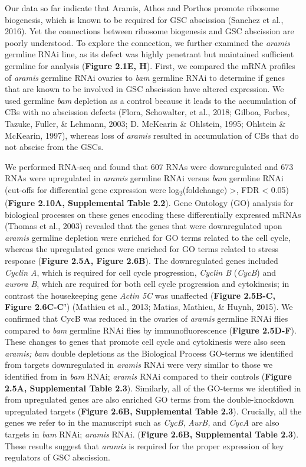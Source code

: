 \documentclass[12pt,oneside]{reedthesis}
\begin{document}
Our data so far indicate that Aramis, Athos and Porthos promote ribosome
biogenesis, which is known to be required for GSC abscission
(Sanchez et al., 2016). Yet the connections between ribosome biogenesis and
GSC abscission are poorly understood. To explore the connection, we
further examined the \emph{aramis} germline RNAi line, as its defect was
highly penetrant but maintained sufficient germline for analysis
(\textbf{Figure 2.1E, H}). First, we compared the mRNA profiles of \emph{aramis}
germline RNAi ovaries to \emph{bam} germline RNAi to determine if genes that
are known to be involved in GSC abscission have altered expression. We
used germline \emph{bam} depletion as a control because it leads to the
accumulation of CBs with no abscission defects (Flora, Schowalter, et al., 2018; Gilboa, Forbes, Tazuke, Fuller, \& Lehmann, 2003; D. McKearin \& Ohlstein, 1995; Ohlstein \& McKearin, 1997), whereas loss of \emph{aramis}
resulted in accumulation of CBs that do not abscise from the GSCs.

We performed RNA-seq and found that 607 RNAs were downregulated and 673
RNAs were upregulated in \emph{aramis} germline RNAi versus \emph{bam} germline
RNAi (cut-offs for differential gene expression were log\textsubscript{2}(foldchange)
\textgreater{}\textbar, FDR \textless{} 0.05) (\textbf{Figure 2.10A, Supplemental Table 2.2}). Gene
Ontology (GO) analysis for biological processes on these genes encoding
these differentially expressed mRNAs
(Thomas et al., 2003) revealed that the genes that were
downregulated upon \emph{aramis} germline depletion were enriched for GO
terms related to the cell cycle, whereas the upregulated genes were
enriched for GO terms related to stress response (\textbf{Figure 2.5A, Figure 2.6B}). The downregulated genes included \emph{Cyclin A}, which is required
for cell cycle progression, \emph{Cyclin B} (\emph{CycB}) and \emph{aurora B}, which
are required for both cell cycle progression and cytokinesis; in
contrast the housekeeping gene \emph{Actin 5C} was unaffected (\textbf{Figure 2.5B-C, Figure 2.6C-C'}) (Mathieu et al., 2013; Matias, Mathieu, \& Huynh, 2015). We confirmed that
CycB was reduced in the ovaries of \emph{aramis} germline RNAi flies compared
to \emph{bam} germline RNAi flies by immunofluorescence (\textbf{Figure 2.5D-F}).
These changes to genes that promote cell cycle and cytokinesis were also
seen \emph{aramis; bam} double depletions as the Biological Process GO-terms
we identified from targets downregulated in \emph{aramis} RNAi were very
similar to those we identified from in \emph{bam} RNAi; \emph{aramis} RNAi
compared to their controls (\textbf{Figure 2.5A, Supplemental Table 2.3}). Similarly,
all of the GO-terms we identified in from upregulated genes are also
enriched GO terms from the double-knockdown upregulated targets (\textbf{Figure 2.6B, Supplemental Table 2.3}).
Crucially, all the genes we refer to in the
manuscript such as \emph{CycB}, \emph{AurB,} and \emph{CycA} are also targets in \emph{bam}
RNAi; \emph{aramis} RNAi. (\textbf{Figure 2.6B, Supplemental Table 2.3}). These
results suggest that \emph{aramis} is required for the proper expression of
key regulators of GSC abscission.
\end{document}
